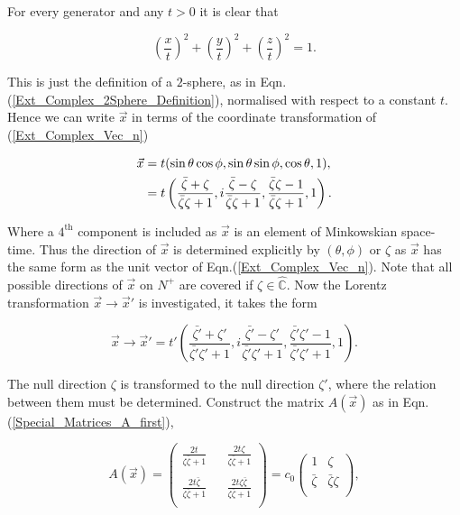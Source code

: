 For every generator and any $t>0$ it is clear that

\begin{equation*}
\left(\frac{x}{t}\right)^2 +\left(\frac{y}{t}\right)^2 +\left(\frac{z}{t}\right)^2 = 1.
\end{equation*}

\noindent This is just the definition of a $2$-sphere, as in Eqn.(\ref{Ext_Complex_2Sphere_Definition}), normalised with respect to a constant $t$. Hence we can write $\vec{x}$ in terms of the coordinate transformation of (\ref{Ext_Complex_Vec_n})

\begin{align}\nonumber
\vec{x} & = t(\sin{\theta}\cos{\phi}, \sin{\theta}\sin{\phi}, \cos{\theta}, 1), \\\label{Ext_Complex_vec_x_relations}
        & = t
\begin{Huge}
\left( \frac{\bar{\zeta} + \zeta}{\bar{\zeta}\zeta + 1}  ,i\frac{\bar{\zeta} - \zeta}{\bar{\zeta}\zeta + 1}, \frac{\bar{\zeta}\zeta - 1}{\bar{\zeta}\zeta + 1},1  \right).
\end{Huge}
\end{align}

\noindent Where a $4^{\text{th}}$ component is included as $\vec{x}$ is an element of Minkowskian space-time. Thus the direction of $\vec{x}$ is determined explicitly by $(\theta,\phi)$ or $\zeta$ as $\vec{x}$ has the same form as the unit vector of Eqn.(\ref{Ext_Complex_Vec_n}). Note that all possible directions of $\vec{x}$ on $N^{+}$ are covered if $\zeta \in \hat{\mathbb{C}}$. Now the Lorentz transformation $\vec{x} \rightarrow \vec{x}'$ is investigated, it takes the form  

\begin{equation*}
\vec{x} \rightarrow \vec{x}' = t'\left( \frac{\bar{\zeta'} + \zeta'}{\bar{\zeta'}\zeta' + 1}  ,i\frac{\bar{\zeta'} - \zeta'}{\bar{\zeta'}\zeta' + 1}, \frac{\bar{\zeta'}\zeta' - 1}{\bar{\zeta'}\zeta' + 1},1  \right).
\end{equation*}

\noindent The null direction $\zeta$ is transformed to the null direction $\zeta'$, where the relation between them must be determined. Construct the matrix $A(\vec{x})$ as in Eqn.(\ref{Special_Matrices_A_first}),

\begin{equation*}
A(\vec{x}) = 
\left(
\begin{array}{ccc}
\frac{2t}{\zeta\bar{\zeta}+1} & & \frac{2t\zeta}{\zeta\bar{\zeta}+1} \\
 & & \\
\frac{2t\bar{\zeta}}{\zeta\bar{\zeta}+1} & & \frac{2t\zeta\bar{\zeta}}{\zeta\bar{\zeta}+1} \\
\end{array}
\right)
=
c_0\left(
\begin{array}{cc}
1           & \zeta \\ 
\bar{\zeta} & \bar{\zeta}\zeta \\ 
\end{array}
\right),
\end{equation*}


